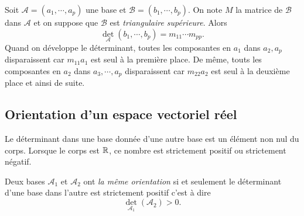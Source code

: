 \begin{exple}
Soit $\mathcal{A} = (a_1, \cdots, a_p)$ une base et $\mathcal{B}=(b_1,\cdots,b_p)$. On note $M$ la matrice de $\mathcal{B}$ dans $\mathcal{A}$ et on suppose que $\mathcal{B}$ est \emph{triangulaire supérieure}. Alors
\[
  \det_\mathcal{A}(b_1, \cdots, b_p) = m_{11} \cdots m_{pp}.
\]
Quand on développe le déterminant, toutes les composantes en $a_1$ dans $a_2, a_p$ disparaissent car $m_{11}a_1$ est seul à la première place. De même, touts les composantes en $a_2$ dans $a_3, \cdots,a_p$ disparaissent car $m_{22}a_2$ est seul à la deuxième place et ainsi de suite. 
\end{exple}


\subsection{Orientation d'un espace vectoriel réel}
Le déterminant dans une base donnée d'une autre base est un élément non nul du corps. Lorsque le corps est $\mathbb{R}$,  ce nombre est strictement positif ou strictement négatif.
\begin{defi}
Deux bases $\mathcal{A}_1$ et $\mathcal{A}_2$ ont \emph{la même orientation} si et seulement le déterminant d'une base dans l'autre est strictement positif c'est à dire
\[
 \det_{\mathcal{A}_1}(\mathcal{A}_2) >0.
\] 
\end{defi}

